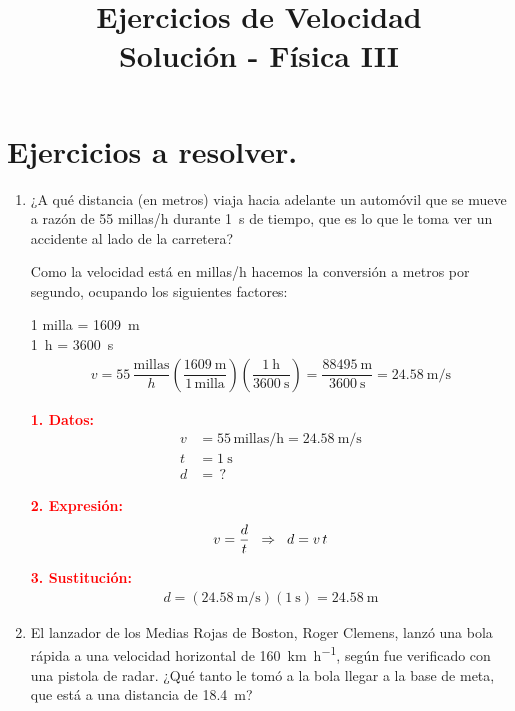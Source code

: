 \documentclass[14pt]{extarticle}
\title{\vspace*{-2cm} Ejercicios de Velocidad \\  Solución - Física III\vspace{-5ex}}
\date{}
\newcommand{\textocolor}[2]{\textbf{\textcolor{#1}{#2}}}
\begin{document}
\maketitle

\section*{Ejercicios a resolver.}

\begin{enumerate}
\item ¿A qué distancia (en metros) viaja hacia adelante un automóvil que se mueve a razón de 55 millas/h durante \SI{1}{\second} de tiempo, que es lo que le toma ver un accidente al lado de la carretera?

Como la velocidad está en millas/h hacemos la conversión a metros por segundo, ocupando los siguientes factores:

1 milla = \SI{1609}{\meter} \\
\SI{1}{\hour} = \SI{3600}{\second}
\begin{align*}
v = 55 \, \dfrac{\text{millas}}{h} \left( \dfrac{\SI{1609}{\meter}}{1 \, \text{milla}} \right)\left( \dfrac{\SI{1}{\hour}}{\SI{3600}{\second}} \right) = \dfrac{\SI{88495}{\meter}}{\SI{3600}{\second}} = \SI[per-mode=fraction]{24.58}{\meter\per\second}
\end{align*}

\begin{minipage}[t]{0.4\linewidth}
\textocolor{red}{1. Datos:}
\begin{align*}
v &= 55 \, \text{millas/h} = \SI[per-mode=fraction]{24.58}{\meter\per\second} \\
t &= \SI{1}{\second} \\
d &= \, ?
\end{align*}
\end{minipage}
\hspace{1cm}
\begin{minipage}[t]{0.4\linewidth}
\textocolor{red}{2. Expresión:}
\begin{align*}
v = \dfrac{d}{t} \hspace{0.2cm} \Rightarrow \hspace{0.2cm} d = v \, t
\end{align*}
\end{minipage}

\textocolor{red}{3. Sustitución:}
\begin{align*}
d = \left( \SI[per-mode=fraction]{24.58}{\meter\per\second} \right) (\SI{1}{\second}) = \SI{24.58}{\meter}
\end{align*}
\item El lanzador de los Medias Rojas de Boston, Roger Clemens, lanzó una bola rápida a una velocidad horizontal de \SI{160}{\kilo\meter\per\hour}, según fue verificado con una pistola de radar. ¿Qué tanto le tomó a la bola llegar a la base de meta, que está a una distancia de \SI{18.4}{\meter}?


\end{enumerate}
\end{document}
